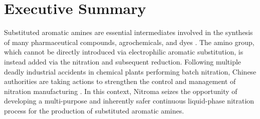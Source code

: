 \section*{Executive Summary}
\label{sec:exec-summary}

Substituted aromatic amines are essential intermediates involved in the synthesis of many pharmaceutical compounds, agrochemicals, and dyes  \cite{vogt_amines_2000}. The amino group, which cannot be directly introduced via electrophilic aromatic substitution, is instead added via the nitration and subsequent reduction.
Following multiple deadly industrial accidents in chemical plants performing batch nitration, Chinese authorities are taking actions to strengthen the control and management of nitration manufacturing \cite{el_diario_china_2019}.
In this context, Nitroma seizes the opportunity of developing a multi-purpose and inherently safer continuous liquid-phase nitration process for the production of substituted aromatic  amines. 